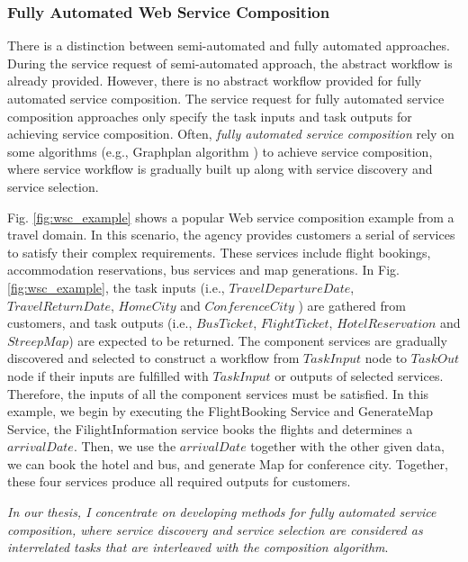 \subsubsection{Fully Automated Web Service Composition}\label{fully}

There is a distinction between semi-automated and fully automated approaches. During the service request of semi-automated approach, the abstract workflow is already provided. However, there is no abstract workflow provided for fully automated service composition. The service request for fully automated service composition approaches only specify the task inputs and task outputs for achieving service composition. Often, \emph{fully automated service composition} rely on some algorithms (e.g., Graphplan algorithm \cite{blum1997fast}) to achieve service composition, where service workflow is gradually built up along with service discovery and service selection. 

Fig. \ref{fig:wsc_example} shows a popular Web service composition example from a travel domain. In this scenario, the agency provides customers a serial of services to satisfy their complex requirements. These services include flight bookings, accommodation reservations, bus services and map generations. In Fig. \ref{fig:wsc_example}, the task inputs (i.e., $TravelDepartureDate$, $TravelReturnDate$, $HomeCity$ and $ConferenceCity$ ) are gathered from customers, and task outputs (i.e., $BusTicket$, $FlightTicket$, $HotelReservation$ and $StreepMap$) are expected to be returned. The component services are gradually discovered and selected to construct a workflow from $TaskInput$ node to $TaskOut$ node if their inputs are fulfilled with $TaskInput$ or outputs of selected services. Therefore, the inputs of all the component services must be satisfied. In this example, we begin by executing the FlightBooking Service and GenerateMap Service, the FilightInformation service books the flights and determines a $arrivalDate$. Then, we use the $arrivalDate$ together with the other given data, we can book the hotel and bus, and generate Map for conference city. Together, these four services produce all required outputs for customers. 

\emph{In our thesis, I concentrate on developing methods for fully automated service composition, where service discovery and service selection are considered as interrelated tasks that are interleaved with the composition algorithm}. 


